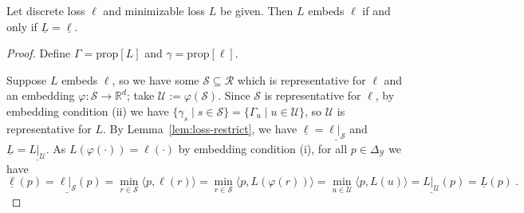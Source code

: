 \documentclass[twoside,11pt]{article}
\newcommand{\reals}{\mathbb{R}}
\newcommand{\prop}[1]{\mathrm{prop}[#1]}
\newcommand{\simplex}{\Delta_\Y}
\newcommand{\R}{\mathcal{R}}
\newcommand{\Sc}{\mathcal{S}}
\newcommand{\U}{\mathcal{U}}
\newcommand{\Y}{\mathcal{Y}}
\newcommand{\risk}[1]{\underline{#1}}
\newcommand{\inprod}[2]{\langle #1, #2 \rangle}%
\begin{document}
\begin{proposition}\label{prop:embed-bayes-risks}
  Let discrete loss $\ell$ and minimizable loss $L$ be given.
  Then $L$ embeds $\ell$ if and only if $\risk{L}=\risk{\ell}$.
\end{proposition}
\begin{proof}
  Define $\Gamma = \prop{L}$ and $\gamma = \prop{\ell}$.
  
  Suppose $L$ embeds $\ell$, so we have some $\Sc\subseteq \R$ which is representative for $\ell$ and an embedding $\varphi:\Sc\to\reals^d$; take $\U := \varphi(\Sc)$.
  Since $\Sc$ is representative for $\ell$, by embedding condition (ii) we have $\{\gamma_s \mid s\in\Sc\} = \{\Gamma_u \mid u\in\U\}$, so $\U$ is representative for $L$.
  By Lemma~\ref{lem:loss-restrict}, we have $\risk{\ell} = \risk{\ell|_{\Sc}}$ and $\risk{L} = \risk{L|_{\U}}$.
  As $L(\varphi(\cdot)) = \ell(\cdot)$ by embedding condition (i), for all $p\in\simplex$ we have
  \begin{equation*}
    \risk{\ell}(p) = \risk{\ell|_\Sc}(p) = \min_{r \in \Sc}\inprod{p}{\ell(r)} = \min_{r \in \Sc}\inprod{p}{L(\varphi(r))} = \min_{u \in \U}\inprod{p}{L(u)} = \risk{L|_\U}(p) = \risk{L}(p)~.
  \end{equation*}
  

\end{proof}
\end{document}
